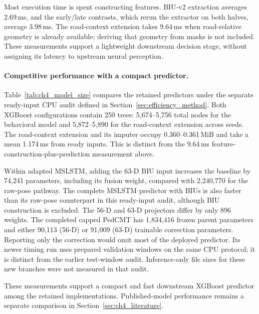 Most execution time is spent constructing features. BIU-v2 extraction averages 2.69\,ms,
and the early/late contrasts, which rerun the extractor on both halves, average 3.98\,ms.
The road-context extension takes 9.64\,ms when road-relative geometry is already
available; deriving that geometry from masks is not included. These measurements support
a lightweight downstream decision stage, without assigning its latency to upstream
neural perception.


\paragraph{Competitive performance with a compact predictor.}
Table~\ref{tab:ch4_model_size} compares the retained predictors under the separate
ready-input CPU audit defined in Section~\ref{sec:efficiency_method}. Both XGBoost
configurations contain 250 trees: 5,674--5,756 total nodes for the behavioral model and
5,872--5,890 for the road-context extension across seeds. The road-context extension and its imputer occupy
0.360--0.361\,MiB and take a mean 1.174\,ms from ready inputs. This is distinct from
the 9.64\,ms feature-construction-plus-prediction measurement above.

Within adapted MSLSTM, adding the 63-D BIU input increases the baseline by 74,241
parameters, including its fusion weight, compared with 2,240,770 for the raw-pose pathway.
The complete MSLSTM predictor with BIUs is also faster than its raw-pose counterpart
in this ready-input audit, although
BIU construction is excluded. The 56-D and 63-D projectors differ by only 896 weights.
The completed capped PedCMT has 1,834,416 frozen parent parameters and either 90,113
(56-D) or 91,009 (63-D) trainable correction parameters. Reporting only the correction
would omit most of the deployed predictor. Its newer timing run uses prepared validation
windows on the same CPU protocol; it is distinct from the earlier test-window audit.
Inference-only file sizes for these new branches were not measured in that audit.

These measurements support a compact and fast downstream XGBoost predictor among the
retained implementations. Published-model performance remains a separate comparison
in Section~\ref{sec:ch4_literature}.




